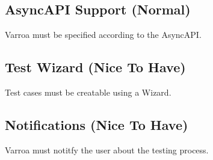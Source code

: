 \subsection{AsyncAPI Support (Normal)}
Varroa must be specified according to the AsyncAPI.

\subsection{Test Wizard (Nice To Have)}
Test cases must be creatable using a Wizard.

\subsection{Notifications (Nice To Have)}
Varroa must notitfy the user about the testing process.


















